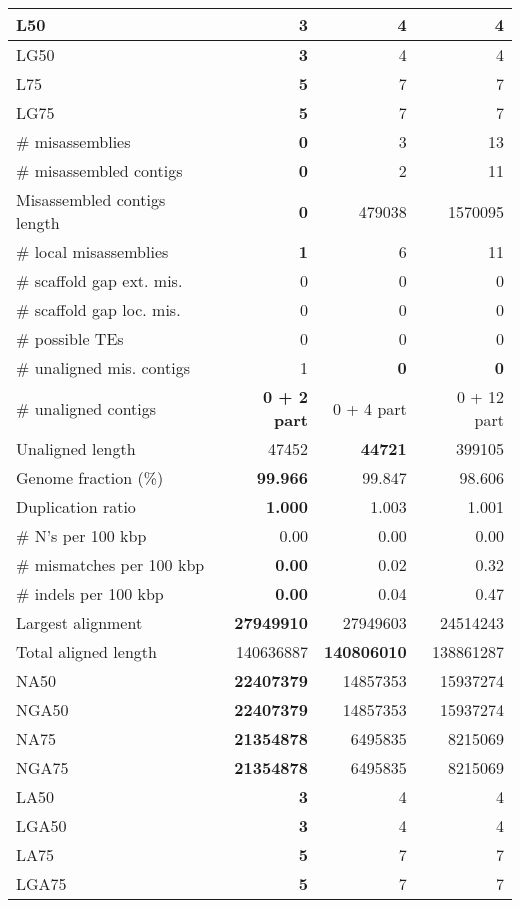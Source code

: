 \documentclass[12pt,a4paper]{article}
\begin{document}
\begin{table}[ht]
\begin{center}
\begin{tabular}{|l*{3}{|r}|}
L50 & {\bf 3} & 4 & 4 \\ \hline
LG50 & {\bf 3} & 4 & 4 \\ \hline
L75 & {\bf 5} & 7 & 7 \\ \hline
LG75 & {\bf 5} & 7 & 7 \\ \hline
\# misassemblies & {\bf 0} & 3 & 13 \\ \hline
\# misassembled contigs & {\bf 0} & 2 & 11 \\ \hline
Misassembled contigs length & {\bf 0} & 479038 & 1570095 \\ \hline
\# local misassemblies & {\bf 1} & 6 & 11 \\ \hline
\# scaffold gap ext. mis. & 0 & 0 & 0 \\ \hline
\# scaffold gap loc. mis. & 0 & 0 & 0 \\ \hline
\# possible TEs & 0 & 0 & 0 \\ \hline
\# unaligned mis. contigs & 1 & {\bf 0} & {\bf 0} \\ \hline
\# unaligned contigs & {\bf 0 + 2 part} & 0 + 4 part & 0 + 12 part \\ \hline
Unaligned length & 47452 & {\bf 44721} & 399105 \\ \hline
Genome fraction (\%) & {\bf 99.966} & 99.847 & 98.606 \\ \hline
Duplication ratio & {\bf 1.000} & 1.003 & 1.001 \\ \hline
\# N's per 100 kbp & 0.00 & 0.00 & 0.00 \\ \hline
\# mismatches per 100 kbp & {\bf 0.00} & 0.02 & 0.32 \\ \hline
\# indels per 100 kbp & {\bf 0.00} & 0.04 & 0.47 \\ \hline
Largest alignment & {\bf 27949910} & 27949603 & 24514243 \\ \hline
Total aligned length & 140636887 & {\bf 140806010} & 138861287 \\ \hline
NA50 & {\bf 22407379} & 14857353 & 15937274 \\ \hline
NGA50 & {\bf 22407379} & 14857353 & 15937274 \\ \hline
NA75 & {\bf 21354878} & 6495835 & 8215069 \\ \hline
NGA75 & {\bf 21354878} & 6495835 & 8215069 \\ \hline
LA50 & {\bf 3} & 4 & 4 \\ \hline
LGA50 & {\bf 3} & 4 & 4 \\ \hline
LA75 & {\bf 5} & 7 & 7 \\ \hline
LGA75 & {\bf 5} & 7 & 7 \\ \hline
\end{tabular}
\end{center}
\end{table}
\end{document}
